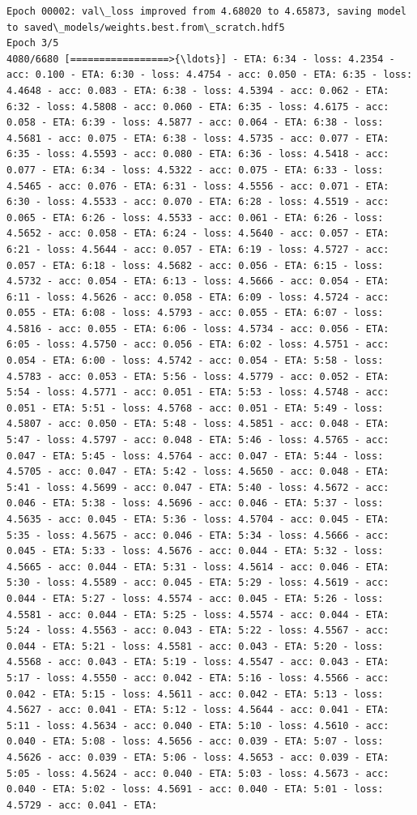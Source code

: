 \documentclass[11pt]{article}
\begin{document}
\begin{Verbatim}[commandchars=\\\{\}]
Epoch 00002: val\_loss improved from 4.68020 to 4.65873, saving model to saved\_models/weights.best.from\_scratch.hdf5
Epoch 3/5
4080/6680 [=================>{\ldots}] - ETA: 6:34 - loss: 4.2354 - acc: 0.100 - ETA: 6:30 - loss: 4.4754 - acc: 0.050 - ETA: 6:35 - loss: 4.4648 - acc: 0.083 - ETA: 6:38 - loss: 4.5394 - acc: 0.062 - ETA: 6:32 - loss: 4.5808 - acc: 0.060 - ETA: 6:35 - loss: 4.6175 - acc: 0.058 - ETA: 6:39 - loss: 4.5877 - acc: 0.064 - ETA: 6:38 - loss: 4.5681 - acc: 0.075 - ETA: 6:38 - loss: 4.5735 - acc: 0.077 - ETA: 6:35 - loss: 4.5593 - acc: 0.080 - ETA: 6:36 - loss: 4.5418 - acc: 0.077 - ETA: 6:34 - loss: 4.5322 - acc: 0.075 - ETA: 6:33 - loss: 4.5465 - acc: 0.076 - ETA: 6:31 - loss: 4.5556 - acc: 0.071 - ETA: 6:30 - loss: 4.5533 - acc: 0.070 - ETA: 6:28 - loss: 4.5519 - acc: 0.065 - ETA: 6:26 - loss: 4.5533 - acc: 0.061 - ETA: 6:26 - loss: 4.5652 - acc: 0.058 - ETA: 6:24 - loss: 4.5640 - acc: 0.057 - ETA: 6:21 - loss: 4.5644 - acc: 0.057 - ETA: 6:19 - loss: 4.5727 - acc: 0.057 - ETA: 6:18 - loss: 4.5682 - acc: 0.056 - ETA: 6:15 - loss: 4.5732 - acc: 0.054 - ETA: 6:13 - loss: 4.5666 - acc: 0.054 - ETA: 6:11 - loss: 4.5626 - acc: 0.058 - ETA: 6:09 - loss: 4.5724 - acc: 0.055 - ETA: 6:08 - loss: 4.5793 - acc: 0.055 - ETA: 6:07 - loss: 4.5816 - acc: 0.055 - ETA: 6:06 - loss: 4.5734 - acc: 0.056 - ETA: 6:05 - loss: 4.5750 - acc: 0.056 - ETA: 6:02 - loss: 4.5751 - acc: 0.054 - ETA: 6:00 - loss: 4.5742 - acc: 0.054 - ETA: 5:58 - loss: 4.5783 - acc: 0.053 - ETA: 5:56 - loss: 4.5779 - acc: 0.052 - ETA: 5:54 - loss: 4.5771 - acc: 0.051 - ETA: 5:53 - loss: 4.5748 - acc: 0.051 - ETA: 5:51 - loss: 4.5768 - acc: 0.051 - ETA: 5:49 - loss: 4.5807 - acc: 0.050 - ETA: 5:48 - loss: 4.5851 - acc: 0.048 - ETA: 5:47 - loss: 4.5797 - acc: 0.048 - ETA: 5:46 - loss: 4.5765 - acc: 0.047 - ETA: 5:45 - loss: 4.5764 - acc: 0.047 - ETA: 5:44 - loss: 4.5705 - acc: 0.047 - ETA: 5:42 - loss: 4.5650 - acc: 0.048 - ETA: 5:41 - loss: 4.5699 - acc: 0.047 - ETA: 5:40 - loss: 4.5672 - acc: 0.046 - ETA: 5:38 - loss: 4.5696 - acc: 0.046 - ETA: 5:37 - loss: 4.5635 - acc: 0.045 - ETA: 5:36 - loss: 4.5704 - acc: 0.045 - ETA: 5:35 - loss: 4.5675 - acc: 0.046 - ETA: 5:34 - loss: 4.5666 - acc: 0.045 - ETA: 5:33 - loss: 4.5676 - acc: 0.044 - ETA: 5:32 - loss: 4.5665 - acc: 0.044 - ETA: 5:31 - loss: 4.5614 - acc: 0.046 - ETA: 5:30 - loss: 4.5589 - acc: 0.045 - ETA: 5:29 - loss: 4.5619 - acc: 0.044 - ETA: 5:27 - loss: 4.5574 - acc: 0.045 - ETA: 5:26 - loss: 4.5581 - acc: 0.044 - ETA: 5:25 - loss: 4.5574 - acc: 0.044 - ETA: 5:24 - loss: 4.5563 - acc: 0.043 - ETA: 5:22 - loss: 4.5567 - acc: 0.044 - ETA: 5:21 - loss: 4.5581 - acc: 0.043 - ETA: 5:20 - loss: 4.5568 - acc: 0.043 - ETA: 5:19 - loss: 4.5547 - acc: 0.043 - ETA: 5:17 - loss: 4.5550 - acc: 0.042 - ETA: 5:16 - loss: 4.5566 - acc: 0.042 - ETA: 5:15 - loss: 4.5611 - acc: 0.042 - ETA: 5:13 - loss: 4.5627 - acc: 0.041 - ETA: 5:12 - loss: 4.5644 - acc: 0.041 - ETA: 5:11 - loss: 4.5634 - acc: 0.040 - ETA: 5:10 - loss: 4.5610 - acc: 0.040 - ETA: 5:08 - loss: 4.5656 - acc: 0.039 - ETA: 5:07 - loss: 4.5626 - acc: 0.039 - ETA: 5:06 - loss: 4.5653 - acc: 0.039 - ETA: 5:05 - loss: 4.5624 - acc: 0.040 - ETA: 5:03 - loss: 4.5673 - acc: 0.040 - ETA: 5:02 - loss: 4.5691 - acc: 0.040 - ETA: 5:01 - loss: 4.5729 - acc: 0.041 - ETA: 
\end{Verbatim}
\end{document}
